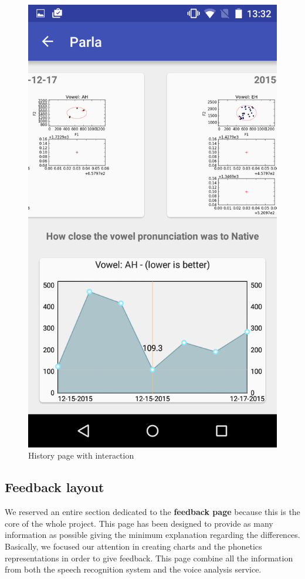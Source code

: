 \begin{figure}[!ht]
\begin{minipage}{.5\textwidth}
		\includegraphics[scale=0.18]{Figures/screenshots/history.png}
		\caption{History page with interaction}
		\label{fig:history_page}
	\end{minipage}
\end{figure}

\subsection{Feedback layout}
\label{ssec:feedback_layout}
We reserved an entire section dedicated to the \textbf{feedback page} because this is the core of the whole project. This page has been designed to provide as many information as possible giving the minimum explanation regarding the differences. Basically, we focused our attention in creating charts and the phonetics representations in order to give feedback. This page combine all the information from both the speech recognition system and the voice analysis service. \\

